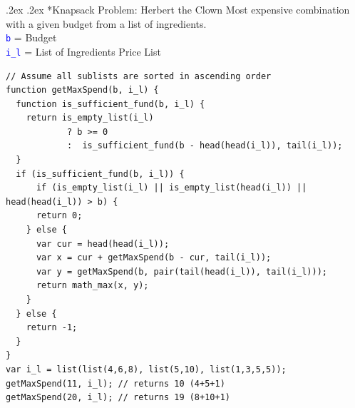 \documentclass[10pt,portrait,a4paper]{article}
\makeatletter
\newcommand\codeblue[1]{\textcolor{blue}{\code{#1}}}
\def\code#1{\texttt{#1}}
\renewcommand{\subsection}{\@startsection{subsection}{1}{0mm}%
                                {.2ex}%
                                {.2ex}%
                                {\sffamily\bfseries}}
\makeatother
\begin{document}
\begin{multicols*}{4}
  \subsection*{Knapsack Problem: Herbert the Clown}
  Most expensive combination with a given budget from a list of ingredients.\\
  \codeblue{b} = Budget\\
  \codeblue{i\_l} = List of Ingredients Price List\\
  \begin{minipage}{\columnwidth}
    \begin{verbatim}
// Assume all sublists are sorted in ascending order
function getMaxSpend(b, i_l) {
  function is_sufficient_fund(b, i_l) {
    return is_empty_list(i_l)
            ? b >= 0
            :  is_sufficient_fund(b - head(head(i_l)), tail(i_l));
  }
  if (is_sufficient_fund(b, i_l)) {
      if (is_empty_list(i_l) || is_empty_list(head(i_l)) || head(head(i_l)) > b) {
      return 0;
    } else {
      var cur = head(head(i_l));
      var x = cur + getMaxSpend(b - cur, tail(i_l));
      var y = getMaxSpend(b, pair(tail(head(i_l)), tail(i_l)));
      return math_max(x, y);
    }
  } else {
    return -1;
  }
}
var i_l = list(list(4,6,8), list(5,10), list(1,3,5,5));
getMaxSpend(11, i_l); // returns 10 (4+5+1)
getMaxSpend(20, i_l); // returns 19 (8+10+1)

\end{verbatim}
  \end{minipage}

\end{multicols*}
\end{document}
